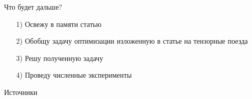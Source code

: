 \documentclass{beamer}
\begin{document}
\begin{frame}{Что будет дальше?}
\begin{enumerate}
    \item[1)] Освежу в памяти статью \cite{Krumnow2019ComputingEW} 
    \item[2)] Обобщу задачу оптимизации изложенную в статье на тензорные поезда
    \item[3)] Решу полученную задачу
    \item[4)] Проведу численные эксперименты
\end{enumerate}
\end{frame}

\begin{frame}{Источники}
    
    
\end{frame}
\end{document}
